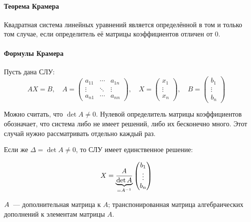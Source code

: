     \paragraph{Теорема Крамера}
    \begin{theorem}
      Квадратная система линейных уравнений является определённой в том и только том случае, если определитель её матрицы коэффициентов отличен от 0.
    \end{theorem}
    \paragraph{Формулы Крамера}
    \label{sle:cramer}

Пусть дана СЛУ:
$$
AX=B,\quad
A=
\begin{pmatrix}
a_{11} & \cdots & a_{1n} \\
\vdots & \ddots & \vdots \\
a_{n1} & \cdots & a_{nn}
\end{pmatrix}
,\quad
X=\begin{pmatrix}
x_1 \\ \vdots \\ x_n
\end{pmatrix}
,\quad
B=\begin{pmatrix}
b_1 \\ \vdots \\ b_n
\end{pmatrix}
$$

Можно считать, что $\det A\ne0$. Нулевой определитель матрицы
коэффициентов обозначает, что система либо не имеет решений, либо их
бесконечно много. Этот случай нужно рассматривать отдельно каждый раз.

Если же $\Delta=\det A\ne0$, то СЛУ имеет единственное решение:

$$
X=\underbrace{\frac{ A}{\det A}}_{=A^{-1}}
\begin{pmatrix}
  b_1 \\ \vdots \\ b_n
\end{pmatrix}
$$

\begin{note}
	$ A$~--- дополнительная матрица к $A$; транспонированная матрица
	алгебраических дополнений к элементам матрицы $A$.
	\begin{center}
  \end{center} 
\end{note}

